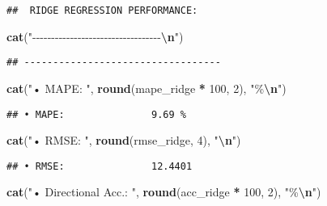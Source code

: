 \documentclass[
]{article}
\newenvironment{Shaded}{\begin{snugshade}}{\end{snugshade}}
\newcommand{\DecValTok}[1]{\textcolor[rgb]{0.00,0.00,0.81}{#1}}
\newcommand{\FunctionTok}[1]{\textcolor[rgb]{0.13,0.29,0.53}{\textbf{#1}}}
\newcommand{\NormalTok}[1]{#1}
\newcommand{\SpecialCharTok}[1]{\textcolor[rgb]{0.81,0.36,0.00}{\textbf{#1}}}
\newcommand{\StringTok}[1]{\textcolor[rgb]{0.31,0.60,0.02}{#1}}
\begin{document}
\begin{verbatim}
##  RIDGE REGRESSION PERFORMANCE:
\end{verbatim}

\begin{Shaded}
\begin{Highlighting}[]
\FunctionTok{cat}\NormalTok{(}\StringTok{"{-}{-}{-}{-}{-}{-}{-}{-}{-}{-}{-}{-}{-}{-}{-}{-}{-}{-}{-}{-}{-}{-}{-}{-}{-}{-}{-}{-}{-}{-}{-}{-}{-}{-}}\SpecialCharTok{\textbackslash{}n}\StringTok{"}\NormalTok{)}
\end{Highlighting}
\end{Shaded}

\begin{verbatim}
## ----------------------------------
\end{verbatim}

\begin{Shaded}
\begin{Highlighting}[]
\FunctionTok{cat}\NormalTok{(}\StringTok{"• MAPE:              "}\NormalTok{, }\FunctionTok{round}\NormalTok{(mape\_ridge }\SpecialCharTok{*} \DecValTok{100}\NormalTok{, }\DecValTok{2}\NormalTok{), }\StringTok{"\%}\SpecialCharTok{\textbackslash{}n}\StringTok{"}\NormalTok{)}
\end{Highlighting}
\end{Shaded}

\begin{verbatim}
## • MAPE:               9.69 %
\end{verbatim}

\begin{Shaded}
\begin{Highlighting}[]
\FunctionTok{cat}\NormalTok{(}\StringTok{"• RMSE:              "}\NormalTok{, }\FunctionTok{round}\NormalTok{(rmse\_ridge, }\DecValTok{4}\NormalTok{), }\StringTok{"}\SpecialCharTok{\textbackslash{}n}\StringTok{"}\NormalTok{)}
\end{Highlighting}
\end{Shaded}

\begin{verbatim}
## • RMSE:               12.4401
\end{verbatim}

\begin{Shaded}
\begin{Highlighting}[]
\FunctionTok{cat}\NormalTok{(}\StringTok{"• Directional Acc.:  "}\NormalTok{, }\FunctionTok{round}\NormalTok{(acc\_ridge }\SpecialCharTok{*} \DecValTok{100}\NormalTok{, }\DecValTok{2}\NormalTok{), }\StringTok{"\%}\SpecialCharTok{\textbackslash{}n}\StringTok{"}\NormalTok{)}
\end{Highlighting}
\end{Shaded}
\end{document}
